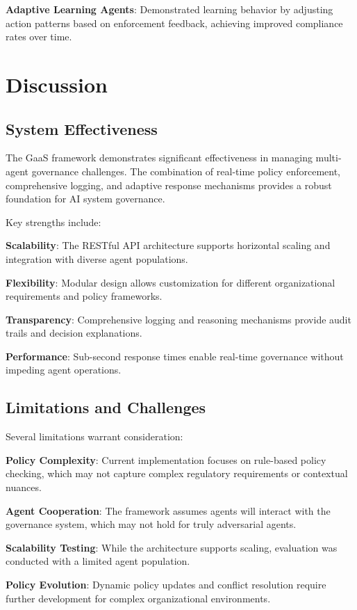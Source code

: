 \documentclass[letterpaper]{article}
\begin{document}
\textbf{Adaptive Learning Agents}: Demonstrated learning behavior by adjusting action patterns based on enforcement feedback, achieving improved compliance rates over time.

\section{Discussion}

\subsection{System Effectiveness}

The GaaS framework demonstrates significant effectiveness in managing multi-agent governance challenges. The combination of real-time policy enforcement, comprehensive logging, and adaptive response mechanisms provides a robust foundation for AI system governance.

Key strengths include:

\textbf{Scalability}: The RESTful API architecture supports horizontal scaling and integration with diverse agent populations.

\textbf{Flexibility}: Modular design allows customization for different organizational requirements and policy frameworks.

\textbf{Transparency}: Comprehensive logging and reasoning mechanisms provide audit trails and decision explanations.

\textbf{Performance}: Sub-second response times enable real-time governance without impeding agent operations.

\subsection{Limitations and Challenges}

Several limitations warrant consideration:

\textbf{Policy Complexity}: Current implementation focuses on rule-based policy checking, which may not capture complex regulatory requirements or contextual nuances.

\textbf{Agent Cooperation}: The framework assumes agents will interact with the governance system, which may not hold for truly adversarial agents.

\textbf{Scalability Testing}: While the architecture supports scaling, evaluation was conducted with a limited agent population.

\textbf{Policy Evolution}: Dynamic policy updates and conflict resolution require further development for complex organizational environments.
\end{document}
